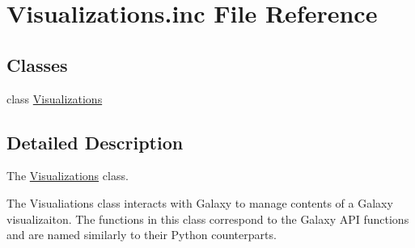 \hypertarget{Visualizations_8inc}{}\section{Visualizations.\+inc File Reference}
\label{Visualizations_8inc}
\subsection*{Classes}
\begin{DoxyCompactItemize}
\item 
class \hyperlink{classVisualizations}{Visualizations}
\end{DoxyCompactItemize}


\subsection{Detailed Description}
The \hyperlink{classVisualizations}{Visualizations} class.

The Visualiations class interacts with Galaxy to manage contents of a Galaxy visualizaiton. The functions in this class correspond to the Galaxy A\+PI functions and are named similarly to their Python counterparts. 